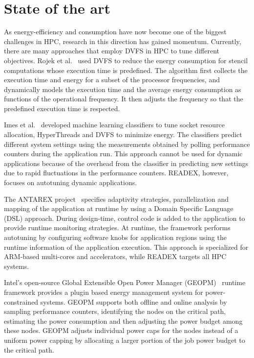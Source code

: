 \section{State of the art} \label{sec:related-work}
As energy-efficiency and consumption have now become one of the biggest challenges in HPC, research in this direction has gained momentum. Currently, there are many approaches that employ DVFS in
HPC to tune different objectives. Rojek et al.~\cite{Rojek} used DVFS to reduce the energy consumption for stencil computations whose execution time is predefined. The algorithm first collects the execution time and energy for a subset of the processor frequencies, and dynamically models the execution time and the average energy consumption as functions of the operational frequency. It then adjusts the frequency so that the predefined execution time is respected.

Imes et al.~\cite{Imes} developed machine learning classifiers to tune socket resource allocation, HyperThreads and DVFS to minimize energy. The classifiers predict different system settings using the measurements obtained by polling performance counters during the application run. This approach cannot be used for dynamic applications because of the overhead from the classifier in predicting new settings due to rapid fluctuations in the performance counters. READEX, however, focuses on autotuning dynamic applications.
	
The ANTAREX project~\cite{silvano2016antarex} specifies adaptivity strategies, parallelization and mapping of the application at runtime by using a Domain Specific Language (DSL) approach. During design-time, control code is added to the application to provide runtime monitoring strategies. At runtime, the framework performs autotuning by configuring software knobs for application regions using the runtime information of the application execution. This approach is specialized for ARM-based multi-cores and accelerators, while READEX targets all HPC systems.

Intel's open-source Global Extensible Open Power Manager (GEOPM)~\cite{geopm} runtime framework provides a plugin based energy management system for power-constrained systems. GEOPM supports both offline and online analysis by sampling performance counters, identifying the nodes on the critical path, estimating the power consumption and then adjusting the power budget among these nodes. GEOPM adjusts individual power caps for the nodes instead of a uniform power capping by allocating a larger portion of the job power budget to the critical path. 
	
